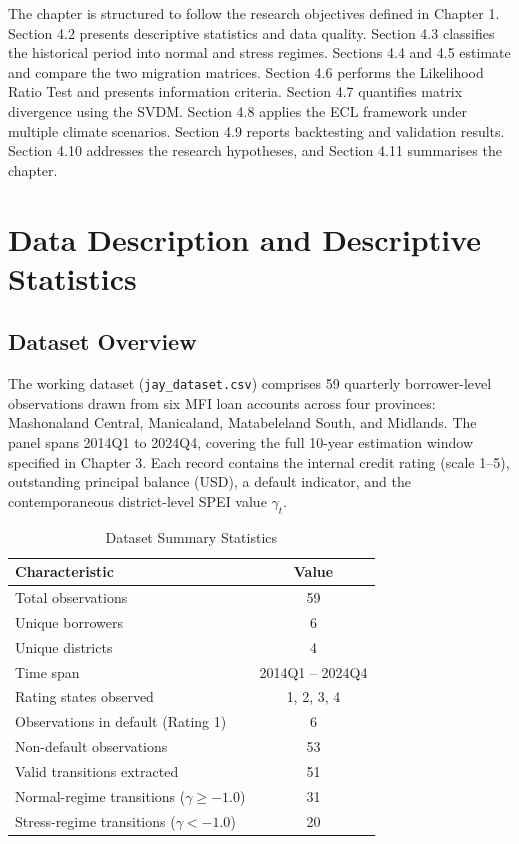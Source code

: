 \documentclass[12pt,a4paper]{article}
\begin{document}
The chapter is structured to follow the research objectives defined in Chapter 1. Section 4.2 presents descriptive statistics and data quality. Section 4.3 classifies the historical period into normal and stress regimes. Sections 4.4 and 4.5 estimate and compare the two migration matrices. Section 4.6 performs the Likelihood Ratio Test and presents information criteria. Section 4.7 quantifies matrix divergence using the SVDM. Section 4.8 applies the ECL framework under multiple climate scenarios. Section 4.9 reports backtesting and validation results. Section 4.10 addresses the research hypotheses, and Section 4.11 summarises the chapter.

\section{Data Description and Descriptive Statistics}

\subsection{Dataset Overview}

The working dataset (\texttt{jay\_dataset.csv}) comprises 59 quarterly borrower-level observations drawn from six MFI loan accounts across four provinces: Mashonaland Central, Manicaland, Matabeleland South, and Midlands. The panel spans 2014Q1 to 2024Q4, covering the full 10-year estimation window specified in Chapter 3. Each record contains the internal credit rating (scale 1--5), outstanding principal balance (USD), a default indicator, and the contemporaneous district-level SPEI value $\gamma_t$.

\begin{table}[H]
\centering
\caption{Dataset Summary Statistics}
\label{tab:data_summary}
\begin{tabular}{@{}lc@{}}
\toprule
\textbf{Characteristic} & \textbf{Value} \\
\midrule
Total observations & 59 \\
Unique borrowers & 6 \\
Unique districts & 4 \\
Time span & 2014Q1 -- 2024Q4 \\
Rating states observed & 1, 2, 3, 4 \\
Observations in default (Rating 1) & 6 \\
Non-default observations & 53 \\
Valid transitions extracted & 51 \\
\quad Normal-regime transitions ($\gamma \geq -1.0$) & 31 \\
\quad Stress-regime transitions ($\gamma < -1.0$) & 20 \\
\bottomrule
\end{tabular}
\end{table}
\end{document}
